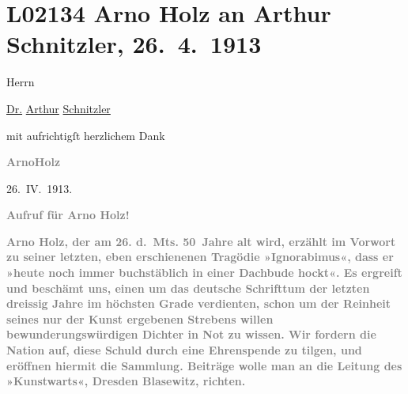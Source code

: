 

\section[Arno Holz an Arthur Schnitzler, 26. 4. 1913]{L02134 Arno Holz an Arthur Schnitzler, 26. 4. 1913}
\nopagebreak{}
\rehead{ }\normalsize\beginnumbering{}
\toendnotes[C]{\smallbreak\pagebreak[2]}
\pstart
           \noindent{}{\pb}Herrn\pend
           
\pstart
           \uline{Dr.}{ }\uline{Arthur}{ }\uline{Schnitzler}\pend
           
\pstart
           mit aufrichtigſt herzlichem Dank\pend
           
\pstart
           \centering{}\textcolor{gray}{\textbf{ArnoHolz}}\pend
           
\pstart
           \centering{}26. IV. 1913.\pend
           
\pstart
           \centering{}{\pb}\textcolor{gray}{\textbf{Aufruf für Arno Holz!}}\pend
           
\pstart
           \textcolor{gray}{\textbf{Arno Holz, der am 26. d. Mts. 50 Jahre alt wird,
                  erzählt im Vorwort zu seiner letzten, eben erschienenen Tragödie »Ignorabimus«, dass er »heute noch immer
                  buchstäblich in einer Dachbude hockt«. Es ergreift und beschämt uns, einen um das
                  deutsche Schrifttum der letzten dreissig Jahre im höchsten Grade verdienten, schon
                  um der Reinheit seines nur der Kunst ergebenen Strebens willen
                  bewunderungswürdigen Dichter in Not zu wissen. Wir fordern die Nation auf, diese
                  Schuld durch eine Ehrenspende zu tilgen, und eröffnen hiermit die Sammlung.
                  Beiträge wolle man an die Leitung des »Kunstwarts«, Dresden Blasewitz,
                  richten.}}\pend
           
